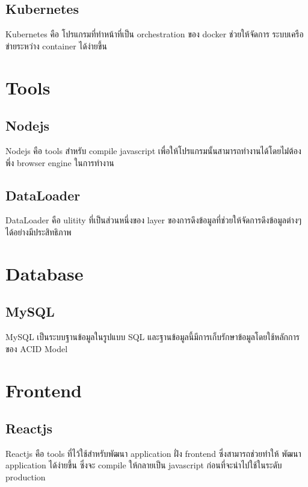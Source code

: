 \subsection{Kubernetes}

Kubernetes \cite{kubernetes} คือ โปรแกรมที่ทำหน้าที่เป็น orchestration \cite  {orchestration} ของ docker ช่วยให้จัดการ ระบบเครือข่ายระหว่าง container ได้ง่ายขึ้น

\section{Tools}

\subsection{Nodejs}

Nodejs \cite{nodejs} คือ tools สำหรับ compile javascript \cite{javascript} เพื่อให้โปรแกรมนั้นสามารถทำงานได้โดยไม่่ต้องพึ่ง browser engine ในการทำงาน

\subsection{DataLoader}

DataLoader \cite{dataloader} คือ ulitity ที่เป็นส่วนหนึ่งของ layer ของการดึงข้อมูลที่ช่วยให้จัดการดึงข้อมูลต่างๆ ได้อย่างมีประสิทธิภาพ


\section{Database}
\subsection{MySQL}

MySQL เป็นระบบฐานข้อมูลในรูปแบบ SQL และฐานข้อมูลนี้มีการเก็บรักษาข้อมูลโดยใช้หลักการของ ACID Model \cite{acid}

\section{Frontend}

\subsection{Reactjs}

Reactjs \cite{reactjs} คือ tools ที่ไว้ใช้สำหรับพัฒนา application ฝั่ง frontend ซึ่งสามารถช่วยทำให้ พัฒนา application ได้ง่ายขึ้น ซึ่งจะ compile ให้กลายเป็น javascript ก่อนที่จะนำไปใช้ในระดับ production

